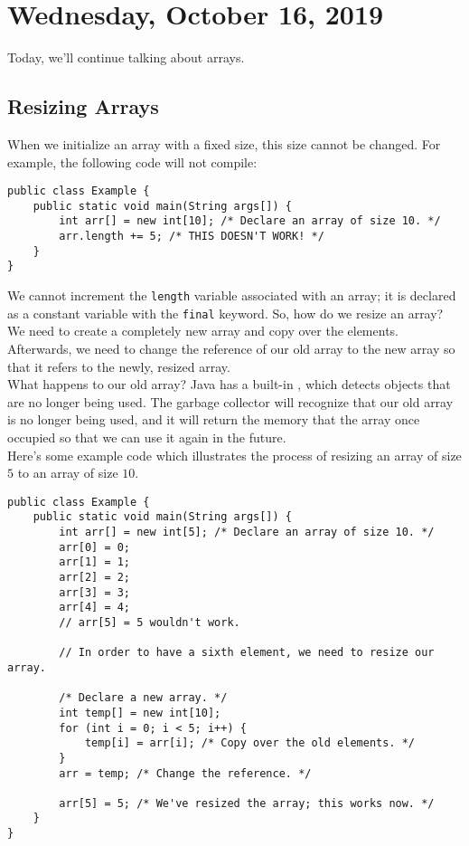 \section{Wednesday, October 16, 2019}

Today, we'll continue talking about arrays.

\subsection{Resizing Arrays}

When we initialize an array with a fixed size, this size cannot be changed. For example, the following code will not compile:

\begin{lstlisting}
public class Example {
    public static void main(String args[]) {
        int arr[] = new int[10]; /* Declare an array of size 10. */
        arr.length += 5; /* THIS DOESN'T WORK! */
    }
}
\end{lstlisting}

We cannot increment the \verb!length! variable associated with an array; it is declared as a constant variable with the \verb!final! keyword. So, how do we resize an array? We need to create a completely new array and copy over the elements. Afterwards, we need to change the reference of our old array to the new array so that it refers to the newly, resized array. \\

What happens to our old array? Java has a built-in , which detects objects that are no longer being used. The garbage collector will recognize that our old array is no longer being used, and it will return the memory that the array once occupied so that we can use it again in the future. \\

Here's some example code which illustrates the process of resizing an array of size $5$ to an array of size $10$.

\begin{lstlisting}
public class Example {
    public static void main(String args[]) {
        int arr[] = new int[5]; /* Declare an array of size 10. */
        arr[0] = 0;
        arr[1] = 1;
        arr[2] = 2;
        arr[3] = 3;
        arr[4] = 4;
        // arr[5] = 5 wouldn't work.
        
        // In order to have a sixth element, we need to resize our array. 
        
        /* Declare a new array. */
        int temp[] = new int[10];
        for (int i = 0; i < 5; i++) {
            temp[i] = arr[i]; /* Copy over the old elements. */
        }
        arr = temp; /* Change the reference. */
        
        arr[5] = 5; /* We've resized the array; this works now. */
    }
}
\end{lstlisting}

